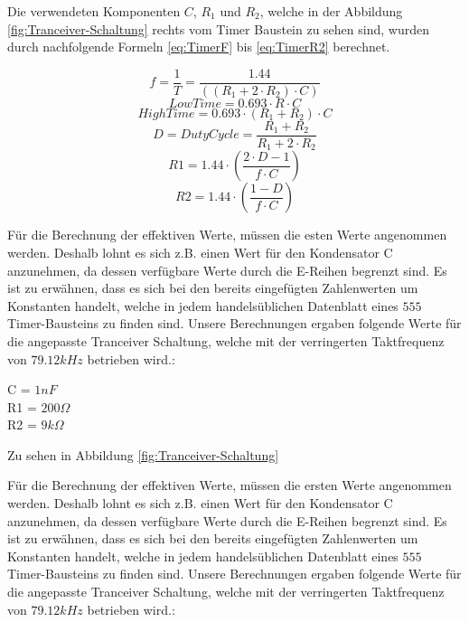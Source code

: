 Die verwendeten Komponenten $C$, $R_{1}$ und $R_{2}$, welche in der Abbildung  \ref{fig:Tranceiver-Schaltung} rechts vom Timer Baustein zu sehen sind, wurden durch nachfolgende Formeln \ref{eq:TimerF} bis \ref{eq:TimerR2} berechnet. 


\begin{equation}\label{eq:Timerf}
f= \dfrac{1}{T}= \dfrac{1.44}{((R_{1} + 2 \cdot R_{2})\cdot C)}
\end{equation}
\begin{equation}\label{eq:TimerTL}
LowTime= 0.693 \cdot R \cdot C
\end{equation}
\begin{equation}\label{eq:TimerTH}
HighTime= 0.693 \cdot (R_{1} + R_{2}) \cdot C
\end{equation}
\begin{equation}\label{eq:TimerDC}
D = DutyCycle = \dfrac{R_{1} + R_{2}}{R_{1} + 2 \cdot R_{2}}
\end{equation}
\begin{equation}\label{eq:TimerR1}
R1 = 1.44 \cdot \left( \dfrac{2 \cdot D - 1}{f \cdot C} \right)
\end{equation}
\begin{equation}\label{eq:TimerR2}
R2 = 1.44 \cdot \left( \dfrac{1-D}{f \cdot C} \right)
\end{equation} 


Für die Berechnung der effektiven Werte, müssen die esten Werte angenommen werden. Deshalb lohnt es sich z.B. einen Wert für den Kondensator C anzunehmen, da dessen verfügbare Werte  durch die E-Reihen begrenzt sind. Es ist zu erwähnen, dass es sich bei den bereits eingefügten Zahlenwerten um Konstanten handelt, welche in jedem handelsüblichen Datenblatt eines $555$ Timer-Bausteins zu finden sind. Unsere Berechnungen ergaben folgende Werte für die angepasste Tranceiver Schaltung, welche mit der verringerten Taktfrequenz von $79.12 kHz$ betrieben wird.:

\begin{center}
C = $1nF$\\
R1 = $200\Omega$\\
R2 = $9k\Omega$\\
\end{center}

Zu sehen in Abbildung \ref{fig:Tranceiver-Schaltung}

Für die Berechnung der effektiven Werte, müssen die ersten Werte angenommen werden. Deshalb lohnt es sich z.B. einen Wert für den Kondensator C anzunehmen, da dessen verfügbare Werte durch die E-Reihen begrenzt sind. Es ist zu erwähnen, dass es sich bei den bereits eingefügten Zahlenwerten um Konstanten handelt, welche in jedem handelsüblichen Datenblatt eines $555$ Timer-Bausteins zu finden sind. Unsere Berechnungen ergaben folgende Werte für die angepasste Tranceiver Schaltung, welche mit der verringerten Taktfrequenz von $79.12 kHz$ betrieben wird.:

